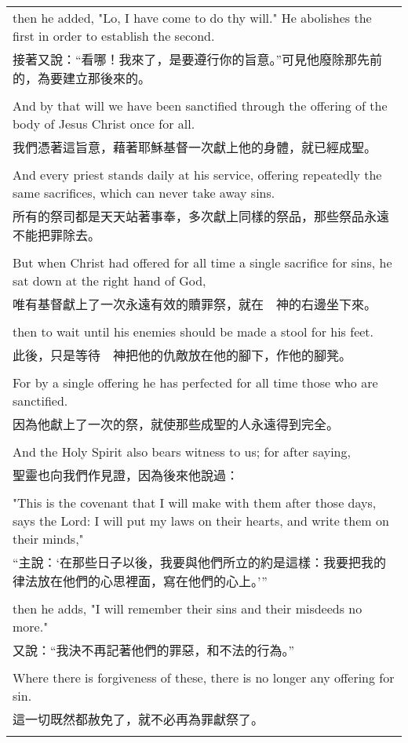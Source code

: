 \documentclass{book}
\begin{document}
\begin{tabularx}{\textwidth}{p{}}
then he added, "Lo, I have come to do thy will." He abolishes the first in order to establish the second. \\
接著又說：“看哪！我來了，是要遵行你的旨意。”可見他廢除那先前的，為要建立那後來的。 \\ \\
And by that will we have been sanctified through the offering of the body of Jesus Christ once for all. \\
我們憑著這旨意，藉著耶穌基督一次獻上他的身體，就已經成聖。 \\ \\
And every priest stands daily at his service, offering repeatedly the same sacrifices, which can never take away sins. \\
所有的祭司都是天天站著事奉，多次獻上同樣的祭品，那些祭品永遠不能把罪除去。 \\ \\
But when Christ had offered for all time a single sacrifice for sins, he sat down at the right hand of God, \\
唯有基督獻上了一次永遠有效的贖罪祭，就在　神的右邊坐下來。 \\ \\
then to wait until his enemies should be made a stool for his feet. \\
此後，只是等待　神把他的仇敵放在他的腳下，作他的腳凳。 \\ \\
For by a single offering he has perfected for all time those who are sanctified. \\
因為他獻上了一次的祭，就使那些成聖的人永遠得到完全。 \\ \\
And the Holy Spirit also bears witness to us; for after saying, \\
聖靈也向我們作見證，因為後來他說過： \\ \\
"This is the covenant that I will make with them after those days, says the Lord: I will put my laws on their hearts, and write them on their minds," \\
“主說：‘在那些日子以後，我要與他們所立的約是這樣：我要把我的律法放在他們的心思裡面，寫在他們的心上。’” \\ \\
then he adds, "I will remember their sins and their misdeeds no more." \\
又說：“我決不再記著他們的罪惡，和不法的行為。” \\ \\
Where there is forgiveness of these, there is no longer any offering for sin. \\
這一切既然都赦免了，就不必再為罪獻祭了。 \\ \\

\hline
\end{tabularx}
\end{document}
